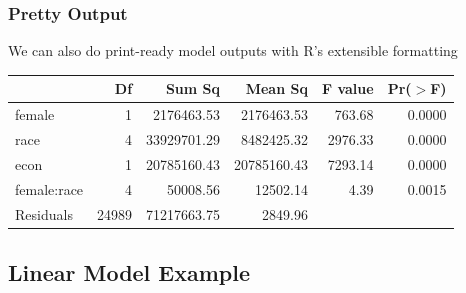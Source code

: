 \documentclass[12pt,handout]{beamer}
\begin{document}
\begin{frame}
\frametitle{Pretty Output}
We can also do print-ready model outputs with R's extensible formatting
\begin{table}[ht]
\begin{center}
\begin{tabular}{lrrrrr}
  \hline
 & Df & Sum Sq & Mean Sq & F value & Pr($>$F) \\ 
  \hline
female      & 1 & 2176463.53 & 2176463.53 & 763.68 & 0.0000 \\ 
  race        & 4 & 33929701.29 & 8482425.32 & 2976.33 & 0.0000 \\ 
  econ        & 1 & 20785160.43 & 20785160.43 & 7293.14 & 0.0000 \\ 
  female:race & 4 & 50008.56 & 12502.14 & 4.39 & 0.0015 \\ 
  Residuals   & 24989 & 71217663.75 & 2849.96 &  &  \\ 
   \hline
\end{tabular}
\end{center}
\end{table}\end{frame}

\subsection{Linear Model Example}
\end{document}

